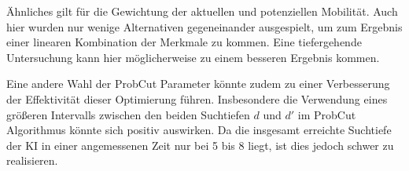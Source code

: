Ähnliches gilt für die Gewichtung der aktuellen und potenziellen Mobilität. Auch hier wurden nur wenige Alternativen
gegeneinander ausgespielt, um zum Ergebnis einer linearen Kombination der Merkmale zu kommen. Eine tiefergehende
Untersuchung kann hier möglicherweise zu einem besseren Ergebnis kommen.

Eine andere Wahl der ProbCut Parameter könnte zudem zu einer Verbesserung der Effektivität dieser Optimierung führen.
Insbesondere die Verwendung eines größeren Intervalls zwischen den beiden Suchtiefen \(d\) und \(d'\) im ProbCut
Algorithmus könnte sich positiv auswirken. Da die insgesamt erreichte Suchtiefe der \ac{KI} in einer angemessenen Zeit
nur bei 5 bis 8 liegt, ist dies jedoch schwer zu realisieren.


